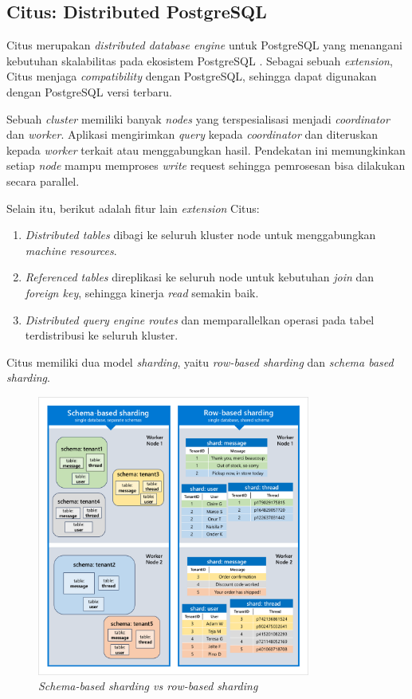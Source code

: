 \subsection{Citus: Distributed PostgreSQL}

Citus merupakan \textit{distributed database engine} untuk PostgreSQL yang menangani kebutuhan skalabilitas pada ekosistem PostgreSQL \parencite{citus}. Sebagai sebuah \textit{extension}, Citus menjaga \textit{compatibility} dengan PostgreSQL, sehingga dapat digunakan dengan PostgreSQL versi terbaru.

Sebuah \textit{cluster} memiliki banyak \textit{nodes} yang terspesialisasi menjadi \textit{coordinator} dan \textit{worker}. Aplikasi mengirimkan \textit{query} kepada \textit{coordinator} dan diteruskan kepada \textit{worker} terkait atau menggabungkan hasil. Pendekatan ini memungkinkan setiap \textit{node} mampu memproses \textit{write} request sehingga pemrosesan bisa dilakukan secara parallel.

Selain itu, berikut adalah fitur lain \textit{extension} Citus:

\begin{enumerate}
    \item \textit{Distributed tables} dibagi ke seluruh kluster node untuk menggabungkan \textit{machine resources}.
    \item \textit{Referenced tables} direplikasi ke seluruh node untuk kebutuhan \textit{join} dan \textit{foreign key}, sehingga kinerja \textit{read} semakin baik.
    \item \textit{Distributed query engine routes} dan memparallelkan operasi pada tabel terdistribusi ke seluruh kluster.
\end{enumerate}

Citus memiliki dua model \textit{sharding}, yaitu \textit{row-based sharding} dan \textit{schema based sharding}.

\begin{figure}[ht]
    \centering
    \includegraphics[width=0.8\textwidth]{resources/chapter-2/row-vs-schema-sharding.png}
    \caption{\textit{Schema-based sharding vs row-based sharding \parencite{schemaBasedSharding}}}
    \label{fig:row-vs-schema-sharding}
\end{figure}

